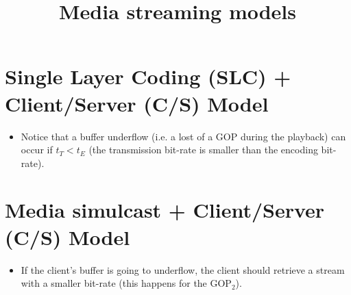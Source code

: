 \title{Media streaming models}

\maketitle
\tableofcontents

\section{Single Layer Coding (SLC) + Client/Server (C/S) Model}


\begin{itemize}
\item Notice that a buffer underflow (i.e. a lost of a GOP during the
  playback) can occur if $t_T<t_E$ (the transmission bit-rate is smaller
  than the encoding bit-rate).
\end{itemize}


\section{Media simulcast + Client/Server (C/S) Model}


\begin{itemize}
\item If the client's buffer is going to underflow, the client should
  retrieve a stream with a smaller bit-rate (this happens for the
  GOP$_2$).
\end{itemize}

